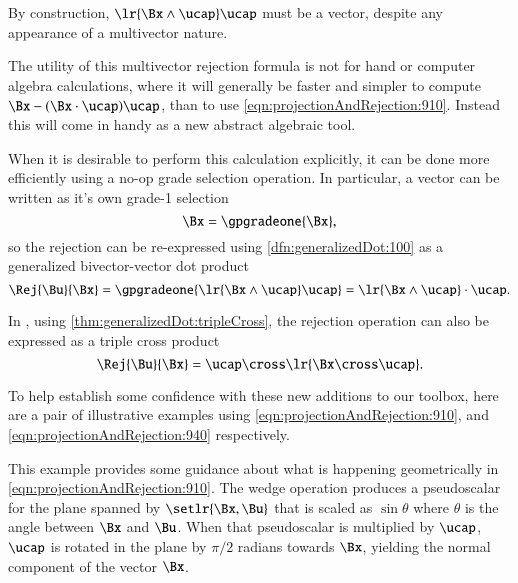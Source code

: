By construction,
\( \lr{ \Bx \wedge \ucap } \ucap \) must be a vector, despite any appearance of a multivector nature.

The utility of this multivector rejection formula is not for hand or computer algebra calculations, where it will generally be faster and simpler to compute \( \Bx - (\Bx \cdot \ucap) \ucap \), than to use \cref{eqn:projectionAndRejection:910}.
Instead this will come in handy as a new abstract algebraic tool.

When it is desirable to perform this calculation explicitly, it can be done more efficiently using a no-op grade selection operation.
In particular, a vector can be written as it's own grade-1 selection
\begin{dmath}\label{eqn:projectionAndRejection:920}
\Bx = \gpgradeone{ \Bx },
\end{dmath}
so the rejection can be re-expressed
using \cref{dfn:generalizedDot:100}
as a generalized bivector-vector dot product
\begin{equation}\label{eqn:projectionAndRejection:940}
\Rej{\Bu}{\Bx}
= \gpgradeone{ \lr{ \Bx \wedge \ucap } \ucap }
= \lr{ \Bx \wedge \ucap } \cdot \ucap.
\end{equation}

In , using \cref{thm:generalizedDot:tripleCross}, the rejection operation can also be expressed as a triple cross product
\begin{dmath}\label{eqn:projectionAndRejection:1140}
\Rej{\Bu}{\Bx}
= \ucap \cross \lr{ \Bx \cross \ucap }.
\end{dmath}

To help establish some confidence with these new additions to our toolbox, here are a
pair of illustrative examples using
\cref{eqn:projectionAndRejection:910}, and
\cref{eqn:projectionAndRejection:940} respectively.


This example provides some guidance about what is happening geometrically in
\cref{eqn:projectionAndRejection:910}.
The wedge operation produces a pseudoscalar for the plane spanned by \( \setlr{\Bx, \Bu} \) that is scaled as \( \sin\theta \) where \( \theta \) is the angle between \( \Bx \) and \( \Bu \).
When that pseudoscalar is multiplied by \( \ucap \), \( \ucap \) is rotated in the plane by \( \pi/2 \) radians towards \( \Bx \), yielding the normal component of the vector \( \Bx \).

